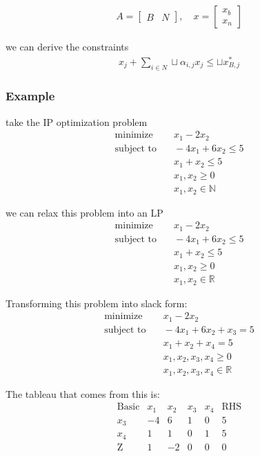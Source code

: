 \begin{align}
  A = 
  \begin{bmatrix}
     B & N
  \end{bmatrix}, 
  \quad
  x =
  \begin{bmatrix}
    x_b \\ x_n
  \end{bmatrix}
\end{align}

we can derive the constraints
\begin{align}
  x_j + \sum_{i \in N} \sqcup{\alpha_{i,j}} x_j \leq \sqcup{x^*_{B,j}}
\end{align}

\subsubsection{Example}
take the IP optimization problem
\begin{align}
  \text{minimize} & \quad x_1 - 2x_2 \\
  \text{subject to} & \quad  -4x_1 + 6x_2 \leq 5 \\
  & \quad x_1 + x_2 \leq 5 \\
  & \quad x_1, x_2 \geq 0 \\
  & \quad x_1, x_2 \in \mathbb{N}
\end{align}

we can relax this problem into an LP
\begin{align}
  \text{minimize} & \quad x_1 - 2x_2 \\
  \text{subject to} & \quad  -4x_1 + 6x_2 \leq 5 \\
  & \quad x_1 + x_2 \leq 5 \\
  & \quad x_1, x_2 \geq 0 \\
  & \quad x_1, x_2 \in \mathbb{R}
\end{align}

Transforming this problem into slack form:
\begin{align}
  \text{minimize} & \quad x_1 - 2x_2 \\
  \text{subject to} & \quad  -4x_1 + 6x_2 + x_3 = 5 \\
  & \quad x_1 + x_2 + x_4 = 5 \\
  & \quad x_1, x_2, x_3, x_4 \geq 0 \\
  & \quad x_1, x_2, x_3, x_4 \in \mathbb{R}
\end{align}

The tableau that comes from this is:
\[
\begin{array}{c|cccc|c}
\text{Basic} & x_1 & x_2 & x_3 & x_4 & \text{RHS} \\
\hline
x_3 & -4 & 6 & 1 & 0 & 5 \\
x_4 & 1 & 1 & 0 & 1 & 5 \\
\hline
\text{Z} & 1 & -2 & 0 & 0 & 0 \\
\end{array}
\]

